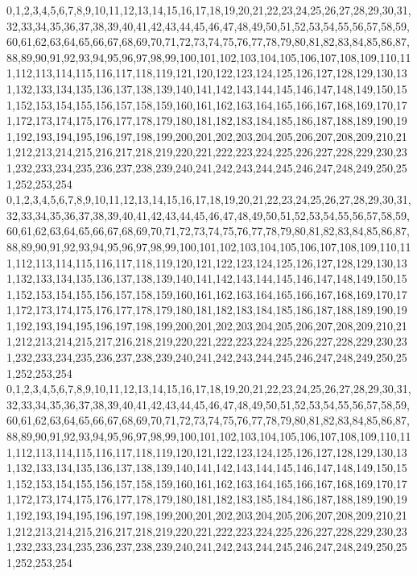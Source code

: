 \documentclass[12pt]{article}
\begin{document}
{0,1,2,3,4,5,6,7,8,9,10,11,12,13,14,15,16,17,18,19,20,21,22,23,24,25,26,27,28,29,30,31,32,33,34,35,36,37,38,39,40,41,42,43,44,45,46,47,48,49,50,51,52,53,54,55,56,57,58,59,60,61,62,63,64,65,66,67,68,69,70,71,72,73,74,75,76,77,78,79,80,81,82,83,84,85,86,87,88,89,90,91,92,93,94,95,96,97,98,99,100,101,102,103,104,105,106,107,108,109,110,111,112,113,114,115,116,117,118,119,121,120,122,123,124,125,126,127,128,129,130,131,132,133,134,135,136,137,138,139,140,141,142,143,144,145,146,147,148,149,150,151,152,153,154,155,156,157,158,159,160,161,162,163,164,165,166,167,168,169,170,171,172,173,174,175,176,177,178,179,180,181,182,183,184,185,186,187,188,189,190,191,192,193,194,195,196,197,198,199,200,201,202,203,204,205,206,207,208,209,210,211,212,213,214,215,216,217,218,219,220,221,222,223,224,225,226,227,228,229,230,231,232,233,234,235,236,237,238,239,240,241,242,243,244,245,246,247,248,249,250,251,252,253,254\\
0,1,2,3,4,5,6,7,8,9,10,11,12,13,14,15,16,17,18,19,20,21,22,23,24,25,26,27,28,29,30,31,32,33,34,35,36,37,38,39,40,41,42,43,44,45,46,47,48,49,50,51,52,53,54,55,56,57,58,59,60,61,62,63,64,65,66,67,68,69,70,71,72,73,74,75,76,77,78,79,80,81,82,83,84,85,86,87,88,89,90,91,92,93,94,95,96,97,98,99,100,101,102,103,104,105,106,107,108,109,110,111,112,113,114,115,116,117,118,119,120,121,122,123,124,125,126,127,128,129,130,131,132,133,134,135,136,137,138,139,140,141,142,143,144,145,146,147,148,149,150,151,152,153,154,155,156,157,158,159,160,161,162,163,164,165,166,167,168,169,170,171,172,173,174,175,176,177,178,179,180,181,182,183,184,185,186,187,188,189,190,191,192,193,194,195,196,197,198,199,200,201,202,203,204,205,206,207,208,209,210,211,212,213,214,215,217,216,218,219,220,221,222,223,224,225,226,227,228,229,230,231,232,233,234,235,236,237,238,239,240,241,242,243,244,245,246,247,248,249,250,251,252,253,254\\
0,1,2,3,4,5,6,7,8,9,10,11,12,13,14,15,16,17,18,19,20,21,22,23,24,25,26,27,28,29,30,31,32,33,34,35,36,37,38,39,40,41,42,43,44,45,46,47,48,49,50,51,52,53,54,55,56,57,58,59,60,61,62,63,64,65,66,67,68,69,70,71,72,73,74,75,76,77,78,79,80,81,82,83,84,85,86,87,88,89,90,91,92,93,94,95,96,97,98,99,100,101,102,103,104,105,106,107,108,109,110,111,112,113,114,115,116,117,118,119,120,121,122,123,124,125,126,127,128,129,130,131,132,133,134,135,136,137,138,139,140,141,142,143,144,145,146,147,148,149,150,151,152,153,154,155,156,157,158,159,160,161,162,163,164,165,166,167,168,169,170,171,172,173,174,175,176,177,178,179,180,181,182,183,185,184,186,187,188,189,190,191,192,193,194,195,196,197,198,199,200,201,202,203,204,205,206,207,208,209,210,211,212,213,214,215,216,217,218,219,220,221,222,223,224,225,226,227,228,229,230,231,232,233,234,235,236,237,238,239,240,241,242,243,244,245,246,247,248,249,250,251,252,253,254\\
}
\end{document}
